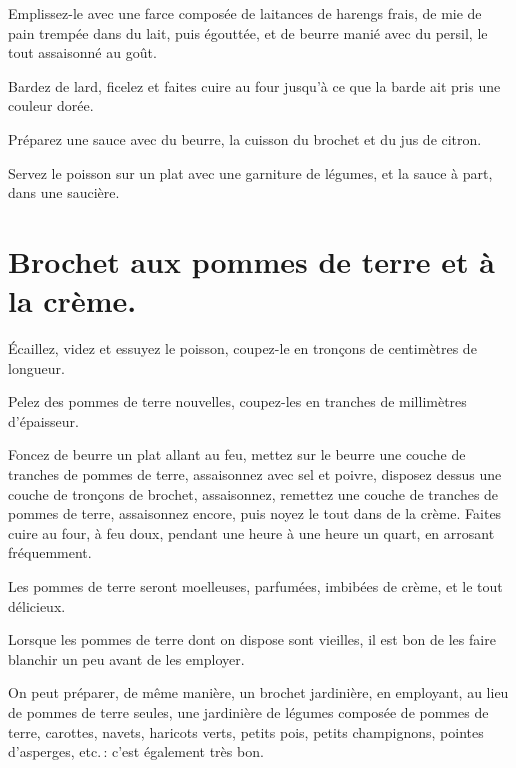 Emplissez-le avec une farce composée de laitances de harengs frais, de mie de
pain trempée dans du lait, puis égouttée, et de beurre manié avec du persil, le
tout assaisonné au goût.

Bardez de lard, ficelez et faites cuire au four jusqu'à ce que la barde ait
pris une couleur dorée.

Préparez une sauce avec du beurre, la cuisson du brochet et du jus de citron.

Servez le poisson sur un plat avec une garniture de légumes, et la sauce à part,
dans une saucière.

\section*{\centering Brochet aux pommes de terre et à la crème.}

Écaillez, videz et essuyez le poisson, coupez-le en tronçons de {\mmm} centimètres
de longueur.

Pelez des pommes de terre nouvelles, coupez-les en tranches de {\mmm} millimètres
d'épaisseur.

Foncez de beurre un plat allant au feu, mettez sur le beurre une couche de
tranches de pommes de terre, assaisonnez avec sel et poivre, disposez dessus
une couche de tronçons de brochet, assaisonnez, remettez une couche de tranches
de pommes de terre, assaisonnez encore, puis noyez le tout dans de la crème.
Faites cuire au four, à feu doux, pendant une heure à une heure un quart, en
arrosant fréquemment.

Les pommes de terre seront moelleuses, parfumées, imbibées de crème, et le tout
délicieux.

Lorsque les pommes de terre dont on dispose sont vieilles, il est bon de les
faire blanchir un peu avant de les employer.

\sk

On peut préparer, de même manière, un brochet jardinière, en employant, au lieu
de pommes de terre seules, une jardinière de légumes composée de pommes de
terre, carottes, navets, haricots verts, petits pois, petits champignons,
pointes d'asperges, etc. : c'est également très bon.

